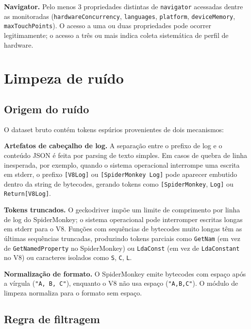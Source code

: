 \textbf{Navigator.} Pelo menos 3 propriedades distintas de \texttt{navigator}
acessadas dentre as monitoradas (\texttt{hardwareConcurrency}, \texttt{languages},
\texttt{platform}, \texttt{deviceMemory}, \texttt{maxTouchPoints}). O acesso a
uma ou duas propriedades pode ocorrer legitimamente; o acesso a três ou mais indica
coleta sistemática de perfil de hardware.

\section{Limpeza de ruído}
\label{sec:limpeza}

\subsection{Origem do ruído}
\label{sub:ruido-origem}

O dataset bruto contém tokens espúrios provenientes de dois mecanismos:

\textbf{Artefatos de cabeçalho de log.} A separação entre o prefixo de log e o
conteúdo JSON é feita por parsing de texto simples. Em casos de quebra de linha
inesperada, por exemplo, quando o sistema operacional interrompe uma escrita em
stderr, o prefixo \texttt{[V8Log]} ou \texttt{[SpiderMonkey Log]} pode
aparecer embutido dentro da string de bytecodes, gerando tokens como
\texttt{[SpiderMonkey}, \texttt{Log]} ou \texttt{Return[V8Log]}.

\textbf{Tokens truncados.} O geckodriver impõe um limite de comprimento por linha de
log do SpiderMonkey; o sistema operacional pode interromper escritas longas em stderr
para o V8. Funções com sequências de bytecodes muito longas têm as últimas sequências
truncadas, produzindo tokens parciais como \texttt{GetNam} (em vez de
\texttt{GetNamedProperty} no SpiderMonkey) ou \texttt{LdaConst} (em vez de
\texttt{LdaConstant} no V8) ou caracteres isolados como \texttt{S}, \texttt{C},
\texttt{L}.

\textbf{Normalização de formato.} O SpiderMonkey emite bytecodes com espaço após
a vírgula (\texttt{"A, B, C"}), enquanto o V8 não usa espaço (\texttt{"A,B,C"}).
O módulo de limpeza normaliza para o formato sem espaço.

\subsection{Regra de filtragem}
\label{sub:ruido-filtro}

